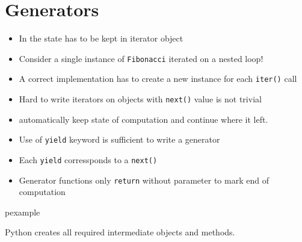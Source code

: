 \documentclass[trans,compress,xcolor=table]{beamer}
\begin{document}
\section{Generators}
\begin{frame}
\begin{itemize}
\item In  the state has to be kept in iterator object
\item Consider  a single instance of \lstinline!Fibonacci! iterated on a nested loop!
\item A correct implementation has to create a new instance for each \lstinline!iter()! call
\item Hard to write iterators on objects with \lstinline!next()! value is
	not trivial
\item {} automatically keep state of computation and continue where it left.
\item Use of \lstinline!yield! keyword is sufficient to write a generator
\item Each \lstinline!yield! corressponds to a \lstinline!next()!
\item Generator functions only \lstinline!return! without parameter to
	mark end of computation
\end{itemize}
\end{frame}

\begin{frame}
\begin{beamercolorbox}{pexample}
\codefibgen

Python creates all required intermediate objects and methods.
\end{beamercolorbox}
\end{frame}
\end{document}
